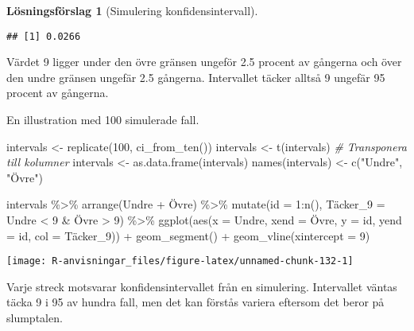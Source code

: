 \documentclass[
]{book}
\newenvironment{Shaded}{\begin{snugshade}}{\end{snugshade}}
\newcommand{\AttributeTok}[1]{\textcolor[rgb]{0.77,0.63,0.00}{#1}}
\newcommand{\CommentTok}[1]{\textcolor[rgb]{0.56,0.35,0.01}{\textit{#1}}}
\newcommand{\DecValTok}[1]{\textcolor[rgb]{0.00,0.00,0.81}{#1}}
\newcommand{\FunctionTok}[1]{\textcolor[rgb]{0.00,0.00,0.00}{#1}}
\newcommand{\NormalTok}[1]{#1}
\newcommand{\OtherTok}[1]{\textcolor[rgb]{0.56,0.35,0.01}{#1}}
\newcommand{\SpecialCharTok}[1]{\textcolor[rgb]{0.00,0.00,0.00}{#1}}
\newcommand{\StringTok}[1]{\textcolor[rgb]{0.31,0.60,0.02}{#1}}
\theoremstyle{definition}
\theoremstyle{definition}
\theoremstyle{definition}
\theoremstyle{definition}
\newtheorem{hypothesis}{Lösningsförslag}[chapter]
\theoremstyle{remark}
\begin{document}
\begin{hypothesis}[Simulering konfidensintervall]
\begin{verbatim}
## [1] 0.0266
\end{verbatim}

Värdet 9 ligger under den övre gränsen ungeför 2.5 procent av gångerna och över den undre gränsen ungefär 2.5 gångerna. Intervallet täcker alltså 9 ungefär 95 procent av gångerna.

En illustration med 100 simulerade fall.

\begin{Shaded}
\begin{Highlighting}[]
\NormalTok{intervals }\OtherTok{\textless{}{-}} \FunctionTok{replicate}\NormalTok{(}\DecValTok{100}\NormalTok{, }\FunctionTok{ci\_from\_ten}\NormalTok{())}
\NormalTok{intervals }\OtherTok{\textless{}{-}} \FunctionTok{t}\NormalTok{(intervals) }\CommentTok{\# Transponera till kolumner}
\NormalTok{intervals }\OtherTok{\textless{}{-}} \FunctionTok{as.data.frame}\NormalTok{(intervals)}
\FunctionTok{names}\NormalTok{(intervals) }\OtherTok{\textless{}{-}} \FunctionTok{c}\NormalTok{(}\StringTok{"Undre"}\NormalTok{, }\StringTok{"Övre"}\NormalTok{)}

\NormalTok{intervals }\SpecialCharTok{\%\textgreater{}\%} 
  \FunctionTok{arrange}\NormalTok{(Undre }\SpecialCharTok{+}\NormalTok{ Övre) }\SpecialCharTok{\%\textgreater{}\%} 
  \FunctionTok{mutate}\NormalTok{(}\AttributeTok{id =} \DecValTok{1}\SpecialCharTok{:}\FunctionTok{n}\NormalTok{(),}
\NormalTok{         Täcker}\AttributeTok{\_9 =}\NormalTok{ Undre }\SpecialCharTok{\textless{}} \DecValTok{9} \SpecialCharTok{\&}\NormalTok{ Övre }\SpecialCharTok{\textgreater{}} \DecValTok{9}\NormalTok{) }\SpecialCharTok{\%\textgreater{}\%} 
  \FunctionTok{ggplot}\NormalTok{(}\FunctionTok{aes}\NormalTok{(}\AttributeTok{x =}\NormalTok{ Undre, }\AttributeTok{xend =}\NormalTok{ Övre, }\AttributeTok{y =}\NormalTok{ id, }\AttributeTok{yend =}\NormalTok{ id, }\AttributeTok{col =}\NormalTok{ Täcker\_9)) }\SpecialCharTok{+}
  \FunctionTok{geom\_segment}\NormalTok{() }\SpecialCharTok{+}
  \FunctionTok{geom\_vline}\NormalTok{(}\AttributeTok{xintercept =} \DecValTok{9}\NormalTok{)}
\end{Highlighting}
\end{Shaded}

\begin{center}\texttt{[image: R-anvisningar\_files/figure-latex/unnamed-chunk-132-1]} \end{center}

Varje streck motsvarar konfidensintervallet från en simulering. Intervallet väntas täcka 9 i 95 av hundra fall, men det kan förstås variera eftersom det beror på slumptalen.
\end{hypothesis}
\end{document}
